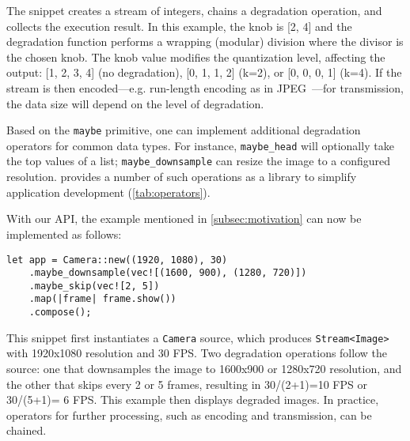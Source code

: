 The snippet creates a stream of integers, chains a degradation operation, and
collects the execution result. In this example, the knob is [2, 4] and the
degradation function performs a wrapping (modular) division where the divisor is
the chosen knob. The knob value modifies the quantization level, affecting the
output: [1, 2, 3, 4] (no degradation), [0, 1, 1, 2] (k=2), or [0, 0, 0, 1]
(k=4). If the stream is then encoded---e.g. run-length encoding as in
JPEG~\cite{wallace1992jpeg}---for transmission, the data size will depend on the
level of degradation.

Based on the \texttt{maybe} primitive, one can implement additional degradation
operators for common data types. For instance, \texttt{maybe\_head} will
optionally take the top values of a list; \texttt{maybe\_downsample} can resize
the image to a configured resolution. \sysname{} provides a number of such
operations as a library to simplify application development
(\autoref{tab:operators}).

With our API, the example mentioned in \autoref{subsec:motivation} can now be
implemented as follows:

\vspace{-4pt}
\begin{lstlisting}
let app = Camera::new((1920, 1080), 30)
    .maybe_downsample(vec![(1600, 900), (1280, 720)])
    .maybe_skip(vec![2, 5])
    .map(|frame| frame.show())
    .compose();
\end{lstlisting}

This snippet first instantiates a \texttt{Camera} source, which produces
\texttt{Stream<Image>} with 1920x1080 resolution and 30 FPS\@. Two degradation
operations follow the source: one that downsamples the image to 1600x900 or
1280x720 resolution, and the other that skips every 2 or 5 frames, resulting in
30/(2+1)=10 FPS or 30/(5+1)= 6 FPS\@. This example then displays degraded
images. In practice, operators for further processing, such as encoding and
transmission, can be chained.


